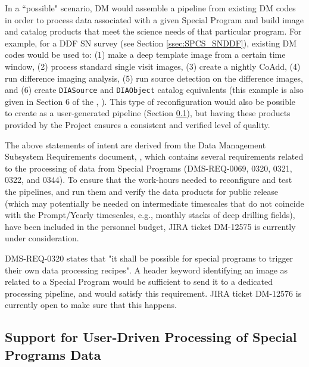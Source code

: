 \documentclass[DM,lsstdoc,toc]{lsstdoc}
\begin{document}
In a ``possible" scenario, DM would assemble a pipeline from existing DM codes in order to process data associated with a given Special Program and build image and catalog products that meet the science needs of that particular program. For example, for a DDF SN survey (see Section \ref{ssec:SPCS_SNDDF}), existing DM codes would be used to: (1) make a deep template image from a certain time window, (2) process standard single visit images, (3) create a nightly CoAdd, (4) run difference imaging analysis, (5) run source detection on the difference images, and (6) create \texttt{DIASource} and \texttt{DIAObject} catalog equivalents (this example is also given in Section 6 of the \DPDD, ). This type of reconfiguration would also be possible to create as a user-generated pipeline (Section \ref{ssec:dmplans_user}), but having these products provided by the Project ensures a consistent and verified level of quality. %

The above statements of intent are derived from the Data Management Subsystem Requirements document, , which contains several requirements related to the processing of data from Special Programs (DMS-REQ-0069, 0320, 0321, 0322, and 0344). To ensure that the work-hours needed to reconfigure and test the pipelines, and run them and verify the data products for public release (which may potentially be needed on intermediate timescales that do not coincide with the Prompt/Yearly timescales, e.g., monthly stacks of deep drilling fields), have been included in the personnel budget, JIRA ticket DM-12575 is currently under consideration. 

DMS-REQ-0320 states that "it shall be possible for special programs to trigger their own data processing recipes". A header keyword identifying an image as related to a Special Program would be sufficient to send it to a dedicated processing pipeline, and would satisfy this requirement. JIRA ticket DM-12576 is currently open to make sure that this happens. 


\subsection{Support for User-Driven Processing of Special Programs Data}\label{ssec:dmplans_user}
\end{document}
